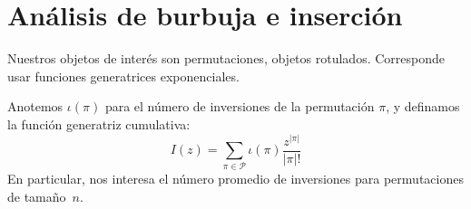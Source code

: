 \section{Análisis de burbuja e inserción}
\label{sec:analisis-burbuja-insercion}

  Nuestros objetos de interés son permutaciones,
  objetos rotulados.
  Corresponde usar funciones generatrices exponenciales.

  Anotemos \(\iota(\pi)\) para el número de inversiones
  de la permutación \(\pi\),
  y definamos la función generatriz cumulativa:
  \begin{equation}
    \label{eq:I-def}
    I(z)
      = \sum_{\pi \in \mathscr{P}}
          \iota(\pi) \frac{z^{\lvert \pi \rvert}}{\lvert \pi \rvert !}
  \end{equation}
  En particular,
  nos interesa el número promedio de inversiones
  para permutaciones de tamaño~\(n\).

